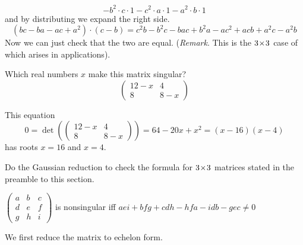 \begin{exercises}
\begin{answer}
\begin{equation*}
          -b^2\cdot c\cdot 1 -c^2\cdot a\cdot 1-a^2\cdot b\cdot 1
       \end{equation*}
       and by distributing we expand the right side.
       \begin{equation*}
         (bc-ba-ac+a^2)\cdot(c-b)
         =c^2b-b^2c-bac+b^2a-ac^2+acb+a^2c-a^2b
       \end{equation*}
       Now we can just check that the two are equal.
       (\textit{Remark}.
       This is the \( 3 \! \times \! 3 \) case of
        which arises in applications).
     \end{answer}
   \recommended \item 
      Which real numbers \( x \) make this matrix singular?
      \begin{equation*}
         \begin{pmatrix}
            12-x  &4  \\
            8    &8-x
         \end{pmatrix}
      \end{equation*}
      \begin{answer}
         This equation
         \begin{equation*}
           0=
           \det(
             \begin{pmatrix}
                12-x  &4  \\
                8    &8-x
             \end{pmatrix}
           )
           =64-20x+x^2
           =(x-16)(x-4) 
       \end{equation*}
       has roots \( x=16 \) and \( x=4 \).  
     \end{answer}
  \item \label{exer:ThreeByThreeDetForm} 
    Do the Gaussian reduction to check
    the formula for $3 \! \times \! 3$ matrices stated in the preamble to
    this section.
    \begin{center}
      \( \begin{pmatrix}
               a  &b  &c  \\
               d  &e  &f  \\
               g  &h  &i
         \end{pmatrix} \)
      is nonsingular iff
      \( aei+bfg+cdh-hfa-idb-gec \neq 0 \)
    \end{center}
    \begin{answer}
      We first reduce the matrix to echelon form.

\end{answer}
\end{exercises}
